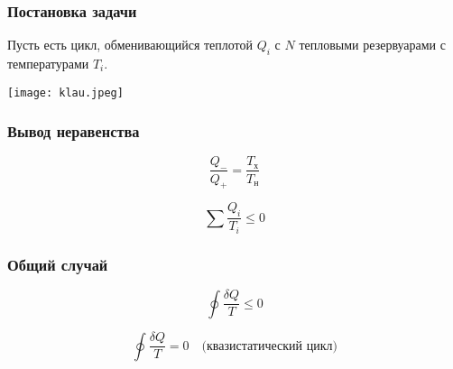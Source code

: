 \documentclass[12pt, a4paper]{article}
\begin{document}
\subsubsection*{Постановка задачи}

Пусть есть цикл, обменивающийся теплотой $Q_i$ с $N$ тепловыми резервуарами с температурами $T_i$.

\begin{center}
\texttt{[image: klau.jpeg]}
\end{center}

\subsubsection*{Вывод неравенства}

\[
\frac{Q_-}{Q_+}=\frac{T_{\text{х}}}{T_{\text{н}}}
\]

\[
\sum \frac{Q_i}{T_i} \le 0
\]

\subsubsection*{Общий случай}

\[
\oint \frac{\delta Q}{T} \le 0
\]

\[
\oint \frac{\delta Q}{T} = 0 \quad \text{(квазистатический цикл)}
\]
\end{document}
